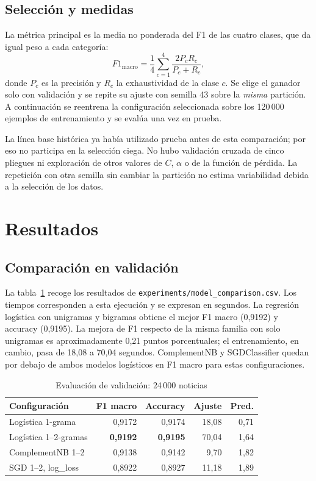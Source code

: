 \documentclass[conference]{IEEEtran}
\begin{document}
\subsection{Selección y medidas}
La métrica principal es la media no ponderada del F1 de las cuatro
clases, que da igual peso a cada categoría:
\begin{equation}
 F1_{\mathrm{macro}}=\frac{1}{4}\sum_{c=1}^{4}
 \frac{2P_cR_c}{P_c+R_c},
\end{equation}
donde \(P_c\) es la precisión y \(R_c\) la exhaustividad de la clase
\(c\). Se elige el ganador solo con validación y se repite su ajuste
con semilla 43 sobre la \emph{misma} partición. A continuación se
reentrena la configuración seleccionada sobre los 120\,000 ejemplos
de entrenamiento y se evalúa una vez en prueba.

La línea base histórica ya había utilizado prueba antes de esta
comparación; por eso no participa en la selección ciega. No hubo
validación cruzada de cinco pliegues ni exploración de otros valores
de \(C\), \(\alpha\) o de la función de pérdida. La repetición con
otra semilla sin cambiar la partición no estima variabilidad debida
a la selección de los datos.

\section{Resultados}
\subsection{Comparación en validación}
La tabla~\ref{tab:val} recoge los resultados de
\texttt{experiments/model\_comparison.csv}. Los tiempos corresponden
a esta ejecución y se expresan en segundos. La regresión logística
con unigramas y bigramas obtiene el mejor F1 macro (0,9192) y
accuracy (0,9195). La mejora de F1 respecto de la misma familia
con solo unigramas es aproximadamente 0,21 puntos porcentuales;
el entrenamiento, en cambio, pasa de 18,08 a 70,04 segundos.
ComplementNB y SGDClassifier quedan por debajo de ambos modelos
logísticos en F1 macro para estas configuraciones.

\begin{table}[t]
\caption{Evaluación de validación: 24\,000 noticias}
\label{tab:val}
\centering
\footnotesize
\begin{tabular}{@{}lrrrr@{}}
\toprule
Configuración & F1 macro & Accuracy & Ajuste & Pred.\\
\midrule
Logística 1-grama & 0,9172 & 0,9174 & 18,08 & 0,71\\
Logística 1--2-gramas & \textbf{0,9192} & \textbf{0,9195} & 70,04 & 1,64\\
ComplementNB 1--2 & 0,9138 & 0,9142 & 9,70 & 1,82\\
SGD 1--2, log\_loss & 0,8922 & 0,8927 & 11,18 & 1,89\\
\bottomrule
\end{tabular}
\end{table}
\end{document}
